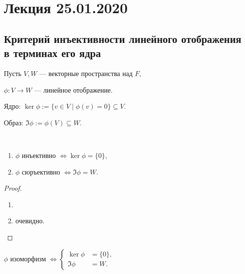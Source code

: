 \section{Лекция 25.01.2020}

\subsection{Критерий инъективности линейного отображения в терминах его ядра}

Пусть $V, W$ --- векторные пространства над $F$, 

$\phi \colon V \to W$ --- линейное отображение.

Ядро: $\ker \phi := \{v \in V \mid \phi(v) = 0\} \subseteq V$.

Образ: $\Im \phi := \phi(V) \subseteq W$.

\begin{proposal}~
    \begin{enumerate}[label=(\alph*)]
    \item $\phi$ инъективно $\iff \ker \phi = \{0\}$,
    \item $\phi$ сюръективно $\iff \Im \phi = W$.
    \end{enumerate}
\end{proposal}

\begin{proof}~
    \begin{enumerate}[label=(\alph*)]
    \item 
    \item очевидно.
        \qedhere
    \end{enumerate}
\end{proof}

\begin{corollary}
    $\phi$ изоморфизм
    \begin{math}
        \iff
        \left\{
        \begin{aligned}
            \ker \phi &= \{0\},\\
            \Im \phi &= W.
        \end{aligned}
        \right.
    \end{math}
\end{corollary}


